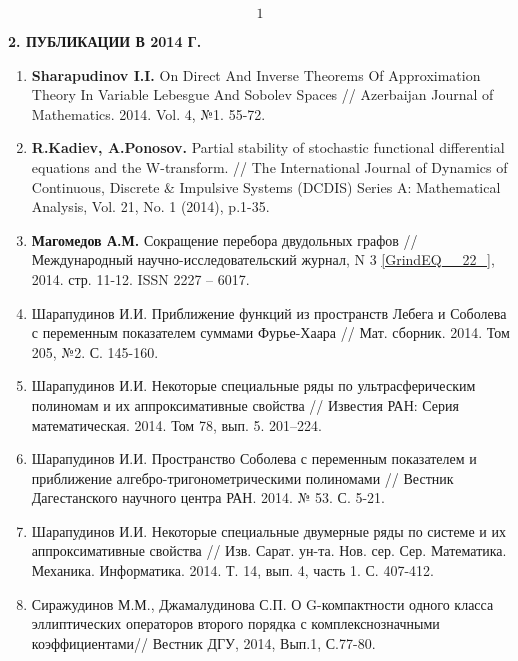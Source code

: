 \documentclass{article}
\begin{document}

\noindent
\[1\]









\textbf{2. ПУБЛИКАЦИИ В 2014 Г.}

\noindent

\begin{enumerate}
\item  \textbf{Sharapudinov I.I. }On Direct And Inverse Theorems Of Approximation Theory In Variable Lebesgue And Sobolev Spaces // Azerbaijan Journal of Mathematics. 2014. Vol. 4, №1. 55-72.

\item  \textbf{R.Kadiev, A.Ponosov. }Partial stability of stochastic functional differential equations and the W-transform. // The International Journal of Dynamics of Continuous, Discrete \& Impulsive Systems (DCDIS) Series A: Mathematical Analysis, Vol. 21, No. 1 (2014), p.1-35.

\item  \textbf{Магомедов А.М. }Сокращение перебора двудольных графов // Международный научно-исследовательский журнал, N 3 \eqref{GrindEQ__22_}, 2014. стр. 11-12. ISSN 2227 -- 6017.

\item  Шарапудинов И.И. Приближение функций из пространств Лебега и Соболева с переменным показателем суммами Фурье-Хаара // Мат. сборник. 2014. Том 205, №2. С. 145-160.

\item  Шарапудинов И.И.\textbf{ }Некоторые специальные ряды по ультрасферическим полиномам и их аппроксимативные свойства // Известия РАН: Серия математическая. 2014. Том 78, вып. 5. 201--224.

\item  Шарапудинов И.И.\textbf{ }Пространство Соболева с переменным показателем и приближение алгебро-тригонометрическими полиномами // Вестник Дагестанского научного центра РАН. 2014. № 53. С. 5-21.

\item  Шарапудинов И.И.\textbf{ }Некоторые специальные двумерные ряды по системе  и их аппроксимативные свойства // Изв. Сарат. ун-та. Нов. сер. Сер. Математика. Механика. Информатика. 2014. Т. 14, вып. 4, часть 1. С. 407-412.

\item  Сиражудинов М.М.,\textbf{ }Джамалудинова С.П.\textbf{ }О G-компактности одного класса эллиптических операторов второго порядка с комплекснозначными коэффициентами// Вестник ДГУ, 2014, Вып.1, С.77-80.


\end{enumerate}
\end{document}
